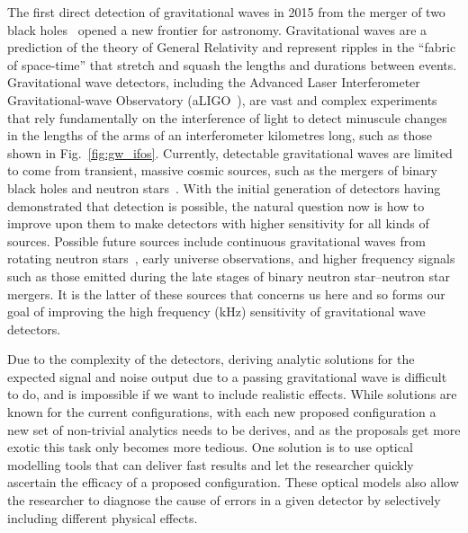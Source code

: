 \documentclass[aps,pra,superscriptaddress,reprint,nofootinbib]{revtex4-1}
\begin{document}
The first direct detection of gravitational waves in 2015 from the merger of two black holes~\cite{GW150914} opened a new frontier for astronomy. 
Gravitational waves are a prediction of the theory of General Relativity and represent ripples in the ``fabric of space-time'' that stretch and squash the lengths and durations between events. Gravitational wave detectors, including the Advanced Laser Interferometer Gravitational-wave Observatory (aLIGO~\cite{AdvancedLIGO:2015}), are vast and complex experiments that rely fundamentally on the interference of light to detect minuscule changes in the lengths of the arms of an interferometer kilometres long, such as those shown in Fig.~\ref{fig:gw_ifos}. Currently, detectable gravitational waves are limited to come from transient, massive cosmic sources, such as the mergers of binary black holes and neutron stars~\cite{GWTC-1:2018}. With the initial generation of detectors having demonstrated that detection is possible, the natural question now is how to improve upon them to make detectors with higher sensitivity for all kinds of sources.
Possible future sources include continuous gravitational waves from rotating neutron stars~\cite{SuvorovaEtAl:2016}, early universe observations, and higher frequency signals such as those emitted during the late stages of binary neutron star--neutron star mergers.
It is the latter of these sources that concerns us here and so forms our goal of improving the high frequency (kHz) sensitivity of gravitational wave detectors.


Due to the complexity of the detectors, deriving analytic solutions for the expected signal and noise output due to a passing gravitational wave is difficult to do, and is impossible if we want to include realistic effects. %
While solutions are known for the current configurations, with each new proposed configuration a new set of non-trivial analytics needs to be derives, and as the proposals get more exotic this task only becomes more tedious.
One solution is to use optical modelling tools that can deliver fast results and let the researcher quickly ascertain the efficacy of a proposed configuration. These optical models also allow the researcher to diagnose the cause of errors in a given detector by selectively including different physical effects.
\end{document}

